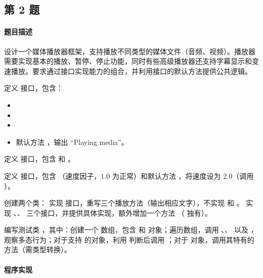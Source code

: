 \documentclass{academics}
\begin{document}
\subsection{第 2 题}

\paragraph{题目描述} {
    设计一个媒体播放器框架，支持播放不同类型的媒体文件（音频、视频）。播放器需要实现基本的播放、暂停、停止功能，同时有些高级播放器还支持字幕显示和变速播放。要求通过接口实现能力的组合，并利用接口的默认方法提供公共逻辑。

    定义  接口，包含：
    \begin{itemize}
        \item {}
        \item {}
        \item {}
        \item 默认方法 ，输出 ``Playing media''。
    \end{itemize}
    定义  接口，包含  和 。

    定义  接口，包含 （速度因子，$1.0$ 为正常）和默认方法 ，将速度设为 $2.0$（调用 ）。

    创建两个类： 实现  接口，重写三个播放方法（输出相应文字），不实现  和 。 实现 、、 三个接口，并提供具体实现，额外增加一个方法 （ 独有）。

    编写测试类 ，其中：创建一个  数组，包含  和  对象；遍历数组，调用 、、 以及 ，观察多态行为；对于支持  的对象，利用  判断后调用 ；对于  对象，调用其特有的  方法（需类型转换）。
}

\paragraph{程序实现} {
    \inputminted[label=Playable.java]{java}{../src/P02/Playable.java}
    \inputminted[label=SubtitleSupport.java]{java}{../src/P02/SubtitleSupport.java}
    \inputminted[label=SpeedControl.java]{java}{../src/P02/SpeedControl.java}
    \inputminted[label=AudioPlayer.java]{java}{../src/P02/AudioPlayer.java}
    \inputminted[label=VideoPlayer.java]{java}{../src/P02/VideoPlayer.java}
    \inputminted[label=MediaCenter.java]{java}{../src/P02/MediaCenter.java}
}
\end{document}

